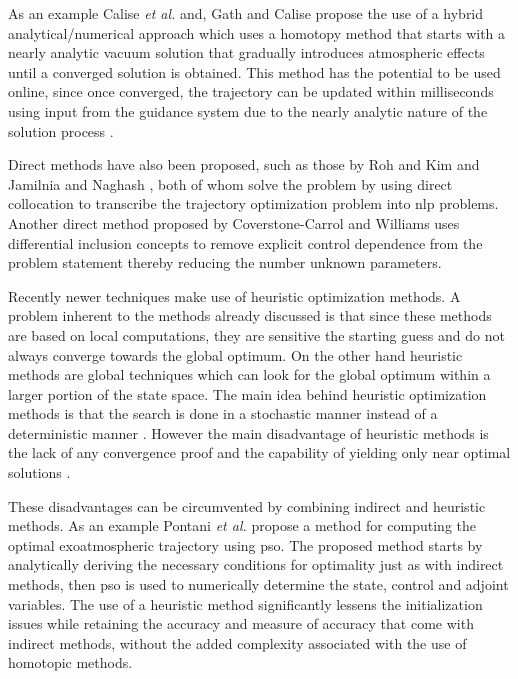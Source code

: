 As an example Calise \emph{et al.} \cite{calise2000further} and, Gath and Calise \cite{gath2001optimization} propose the use of a hybrid analytical/numerical approach which uses a homotopy method that starts with a nearly analytic vacuum solution that gradually introduces atmospheric effects until a converged solution is obtained. This method has the potential to be used online, since once converged, the trajectory can be updated within milliseconds using input from the guidance system due to the nearly analytic nature of the solution process \cite{gath2001optimization}. 

Direct methods have also been proposed, such as those by Roh and Kim \cite{roh2002trajectory} and Jamilnia and Naghash \cite{jamilnia2012simultaneous}, both of whom solve the problem by using direct collocation to transcribe the trajectory optimization problem into \acrfull{nlp} problems. Another direct method proposed by Coverstone-Carrol and Williams \cite{coverstone1994optimal} uses differential inclusion concepts to remove explicit control dependence from the problem statement thereby reducing the number unknown parameters.

Recently newer techniques make use of heuristic optimization methods. A problem inherent to the methods already discussed is that since these methods are based on local computations, they are sensitive the starting guess and do not always converge towards the global optimum. On the other hand heuristic methods are global techniques which can look for the global optimum within a larger portion of the state space. The main idea behind heuristic optimization methods is that the search is done in a stochastic manner instead of a deterministic manner \cite{rao2009survey}. However the main disadvantage of heuristic methods is the lack of any convergence proof and the capability of yielding only near optimal solutions \cite{pontani2014optimal}.

These disadvantages can be circumvented by combining indirect and heuristic methods. As an example Pontani \emph{et al.} \cite{PONTANI2014852, pontani2013ascent, pontani2014simple, pontani2014optimal} propose a method for computing the optimal exoatmospheric trajectory using \acrfull{pso}. The proposed method starts by analytically deriving the necessary conditions for optimality just as with indirect methods, then \acrshort{pso} is used to numerically determine the state, control and adjoint variables. The use of a heuristic method significantly lessens the initialization issues while retaining the accuracy and measure of accuracy that come with indirect methods, without the added complexity associated with the use of homotopic methods. 

